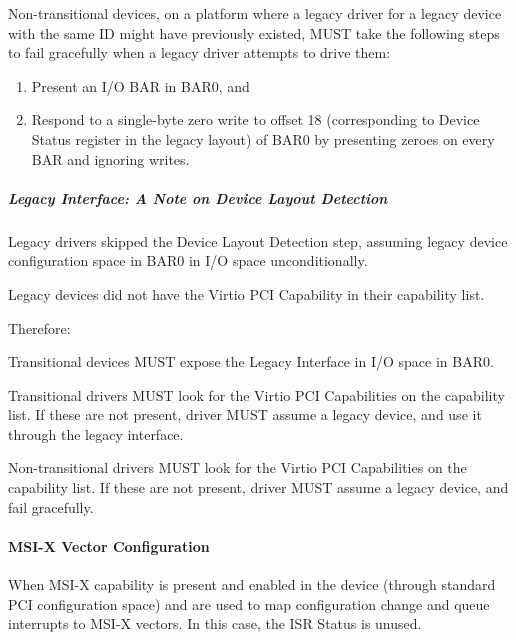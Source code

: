 Non-transitional devices, on a platform where a legacy driver for
a legacy device with the same ID might have previously existed,
MUST take the following steps to fail gracefully when a legacy
driver attempts to drive them:

\begin{enumerate}
\item Present an I/O BAR in BAR0, and
\item Respond to a single-byte zero write to offset 18
   (corresponding to Device Status register in the legacy layout)
   of BAR0 by presenting zeroes on every BAR and ignoring writes.
\end{enumerate}

\subparagraph{Legacy Interface: A Note on Device Layout Detection}\label{sec:Virtio Transport Options / Virtio Over PCI Bus / PCI-specific Initialization And Device Operation / Device Initialization / Virtio Device Configuration Layout Detection / Legacy Interface: A Note on Device Layout Detection}

Legacy drivers skipped the Device Layout Detection step, assuming legacy
device configuration space in BAR0 in I/O space unconditionally.

Legacy devices did not have the Virtio PCI Capability in their
capability list.

Therefore:

Transitional devices MUST expose the Legacy Interface in I/O
space in BAR0.

Transitional drivers MUST look for the Virtio PCI
Capabilities on the capability list.
If these are not present, driver MUST assume a legacy device,
and use it through the legacy interface.

Non-transitional drivers MUST look for the Virtio PCI
Capabilities on the capability list.
If these are not present, driver MUST assume a legacy device,
and fail gracefully.

\paragraph{MSI-X Vector Configuration}\label{sec:Virtio Transport Options / Virtio Over PCI Bus / PCI-specific Initialization And Device Operation / Device Initialization / MSI-X Vector Configuration}

When MSI-X capability is present and enabled in the device
(through standard PCI configuration space)  and  are used to map configuration change and queue
interrupts to MSI-X vectors. In this case, the ISR Status is unused.


